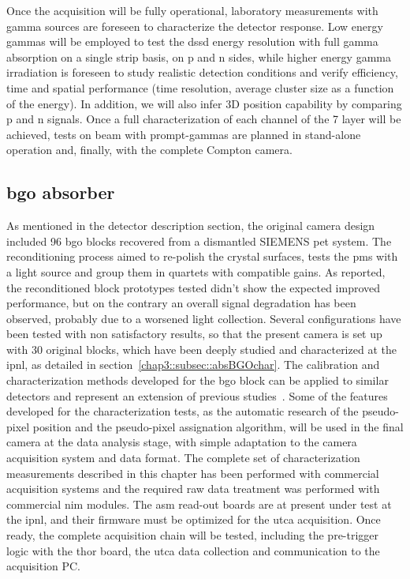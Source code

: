 Once the acquisition will be fully operational, laboratory measurements with gamma sources are foreseen to characterize the detector response. Low energy gammas will be employed to test the \gls{dssd} energy resolution with full gamma absorption on a single strip basis, on p and n sides, while higher energy gamma irradiation is foreseen to study realistic detection conditions and verify efficiency, time and spatial performance (time resolution, average cluster size as a function of the energy). In addition, we will also infer 3D position capability by comparing p and n signals. Once a full characterization of each channel of the 7 layer will be achieved, tests on beam with prompt-gammas are planned in stand-alone operation and, finally, with the complete Compton camera. 
   

\subsection{\gls{bgo} absorber}\label{chap3::subsec::absNext}

As mentioned in the detector description section, the original camera design included 96 \gls{bgo} blocks recovered from a dismantled SIEMENS \gls{pet} system. The reconditioning process aimed to re-polish the crystal surfaces, tests the \glspl{pm} with a light source and group them in quartets with compatible gains. As reported, the reconditioned block prototypes tested didn't show the expected improved performance, but on the contrary an overall signal degradation has been observed, probably due to a worsened light collection. Several configurations have been tested with non satisfactory results, so that the present camera is set up with 30 original blocks, which have been deeply studied and characterized at the \gls{ipnl}, as detailed in section~\ref{chap3::subsec::absBGOchar}. The calibration and characterization methods developed for the \gls{bgo} block can be applied to similar detectors and represent an extension of previous studies~\parencite{Rogers1994, Tornai1994, Golnik2015, HuesoGonzalez2015}. Some of the features developed for the characterization tests, as the automatic research of the pseudo-pixel position and the pseudo-pixel assignation algorithm, will be used in the final camera at the data analysis stage, with simple adaptation to the camera acquisition system and data format. The complete set of characterization measurements described in this chapter has been performed with commercial acquisition systems and the required raw data treatment was performed with commercial \gls{nim} modules. The \gls{asm} read-out boards are at present under test at the \gls{ipnl}, and their firmware must be optimized for the \gls{utca} acquisition. Once ready, the complete acquisition chain will be tested, including the pre-trigger logic with the \gls{thor} board, the \gls{utca} data collection and communication to the acquisition PC.

